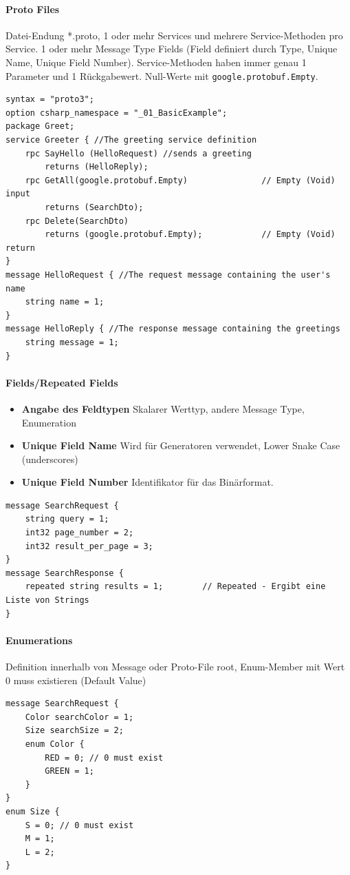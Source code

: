 \documentclass[
a4paper,
oneside,
10pt,
fleqn,
headsepline,
toc=listofnumbered, 
bibliography=totocnumbered]{scrartcl}
\begin{document}
\paragraph{Proto Files} Datei-Endung *.proto, 1 oder mehr Services und mehrere Service-Methoden pro Service. 1 oder mehr Message Type Fields (Field definiert durch Type, Unique Name, Unique Field Number). Service-Methoden haben immer genau 1 Parameter und 1 Rückgabewert. Null-Werte mit \lstinline|google.protobuf.Empty|.
\begin{lstlisting}
syntax = "proto3";
option csharp_namespace = "_01_BasicExample";
package Greet;
service Greeter { //The greeting service definition
    rpc SayHello (HelloRequest) //sends a greeting
        returns (HelloReply);
    rpc GetAll(google.protobuf.Empty)               // Empty (Void) input
        returns (SearchDto);
    rpc Delete(SearchDto)
		returns (google.protobuf.Empty);            // Empty (Void) return
}
message HelloRequest { //The request message containing the user's name
    string name = 1;
}
message HelloReply { //The response message containing the greetings
    string message = 1;
}
\end{lstlisting}

\paragraph{Fields/Repeated Fields}
\begin{itemize}
	\item \textbf{Angabe des Feldtypen} Skalarer Werttyp, andere Message Type, Enumeration
	\item \textbf{Unique Field Name} Wird für Generatoren verwendet, Lower Snake Case (underscores)
	\item \textbf{Unique Field Number} Identifikator für das Binärformat.
\end{itemize}
\begin{lstlisting}
message SearchRequest {
    string query = 1;
    int32 page_number = 2;
    int32 result_per_page = 3;
}
message SearchResponse {
    repeated string results = 1;        // Repeated - Ergibt eine Liste von Strings
}
\end{lstlisting}

\paragraph{Enumerations} Definition innerhalb von Message oder Proto-File root, Enum-Member mit Wert 0 muss existieren (Default Value)
\begin{lstlisting}
message SearchRequest {
    Color searchColor = 1;
    Size searchSize = 2;
    enum Color {
        RED = 0; // 0 must exist
        GREEN = 1;
    }
}
enum Size {
    S = 0; // 0 must exist
    M = 1;
    L = 2;
}
\end{lstlisting}
\end{document}
